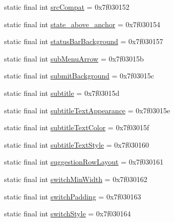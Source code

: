 \begin{DoxyCompactItemize}
\item 
static final int \mbox{\hyperlink{classandroid_1_1support_1_1v7_1_1appcompat_1_1_r_1_1attr_a31695dcc9a8798de0dcc6bc65128efdc}{src\+Compat}} = 0x7f030152
\item 
static final int \mbox{\hyperlink{classandroid_1_1support_1_1v7_1_1appcompat_1_1_r_1_1attr_a533ef94e418a4dc2ebaf0f7d5c382a3c}{state\+\_\+above\+\_\+anchor}} = 0x7f030154
\item 
static final int \mbox{\hyperlink{classandroid_1_1support_1_1v7_1_1appcompat_1_1_r_1_1attr_a8d6c89b1978cdbe6dc1b45af166db6e7}{status\+Bar\+Background}} = 0x7f030157
\item 
static final int \mbox{\hyperlink{classandroid_1_1support_1_1v7_1_1appcompat_1_1_r_1_1attr_ac31266b495aa965e97f9a4b189be9aa4}{sub\+Menu\+Arrow}} = 0x7f03015b
\item 
static final int \mbox{\hyperlink{classandroid_1_1support_1_1v7_1_1appcompat_1_1_r_1_1attr_ac3a5df86db68cc3fec7b8073db21715e}{submit\+Background}} = 0x7f03015c
\item 
static final int \mbox{\hyperlink{classandroid_1_1support_1_1v7_1_1appcompat_1_1_r_1_1attr_ab8de8dc640f29f618a046fe374b2f1b4}{subtitle}} = 0x7f03015d
\item 
static final int \mbox{\hyperlink{classandroid_1_1support_1_1v7_1_1appcompat_1_1_r_1_1attr_a7dcfcdda3ffdf6c31325aae638d168c5}{subtitle\+Text\+Appearance}} = 0x7f03015e
\item 
static final int \mbox{\hyperlink{classandroid_1_1support_1_1v7_1_1appcompat_1_1_r_1_1attr_a14f9d04e8f127eca7da40147affd83c5}{subtitle\+Text\+Color}} = 0x7f03015f
\item 
static final int \mbox{\hyperlink{classandroid_1_1support_1_1v7_1_1appcompat_1_1_r_1_1attr_af9bdd5aa80719f41b93c78349fb16155}{subtitle\+Text\+Style}} = 0x7f030160
\item 
static final int \mbox{\hyperlink{classandroid_1_1support_1_1v7_1_1appcompat_1_1_r_1_1attr_a43fe9bcf135c6f96bb5a064d0173848b}{suggestion\+Row\+Layout}} = 0x7f030161
\item 
static final int \mbox{\hyperlink{classandroid_1_1support_1_1v7_1_1appcompat_1_1_r_1_1attr_a7dbf1d9843483d058a71f761bc51ec36}{switch\+Min\+Width}} = 0x7f030162
\item 
static final int \mbox{\hyperlink{classandroid_1_1support_1_1v7_1_1appcompat_1_1_r_1_1attr_a2b380e1b935b811ec822dbf4a4014d05}{switch\+Padding}} = 0x7f030163
\item 
static final int \mbox{\hyperlink{classandroid_1_1support_1_1v7_1_1appcompat_1_1_r_1_1attr_a5707a72d4574ca65a318099dd8101d59}{switch\+Style}} = 0x7f030164

\end{DoxyCompactItemize}
